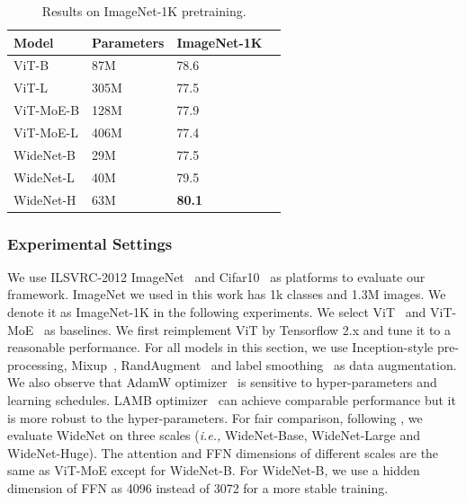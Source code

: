 \documentclass[letterpaper]{article} %
\newcommand{\ie}{\emph{i.e.,}\xspace}
\begin{document}
\begin{table}[t]
\centering
\caption{Results on ImageNet-1K pretraining.}
\label{tbl-main-pretraining-ImageNet}
\begin{tabular}{l|l l l}
\toprule
Model     & Parameters & ImageNet-1K  \\ \midrule
ViT-B               & 87M       & 78.6        \\
ViT-L              & 305M         & 77.5   \\ \midrule
ViT-MoE-B           & 128M          & 77.9   \\
ViT-MoE-L           & 406M        & 77.4   \\ \midrule
WideNet-B         & 29M        & 77.5       \\
WideNet-L          & 40M     & 79.5       \\
WideNet-H          & 63M      & \textbf{80.1}      \\
\bottomrule
\end{tabular}
\end{table}







\subsubsection{Experimental Settings}
\label{sec:cv-settings}

We use ILSVRC-2012 ImageNet~\citep{deng2009imagenet} and Cifar10~\citep{krizhevsky2009learning} as platforms to evaluate our framework. ImageNet we used in this work has 1k classes and 1.3M images. We denote it as ImageNet-1K in the following experiments. We select ViT~\citep{dosovitskiy2020image} and ViT-MoE~\citep{riquelme2021scaling} as baselines. We first reimplement ViT by Tensorflow 2.x and tune it to a reasonable performance. For all models in this section, we use Inception-style pre-processing, Mixup~\citep{zhang2017mixup}, RandAugment~\citep{cubuk2020randaugment} and label smoothing~\citep{szegedy2016rethinking,yuan2020revisiting} as data augmentation. We also observe that AdamW optimizer~\citep{loshchilov2017decoupled} is sensitive to hyper-parameters and learning schedules. LAMB optimizer~\citep{you2019large} can achieve comparable performance but it is more robust to the hyper-parameters. For fair comparison, following \citet{zhai2021scaling}, we evaluate WideNet on three scales (\ie WideNet-Base, WideNet-Large and WideNet-Huge). The attention and FFN dimensions of different scales are the same as ViT-MoE except for WideNet-B. For WideNet-B, we use a hidden dimension of FFN as 4096 instead of 3072 for a more stable training.
\end{document}
